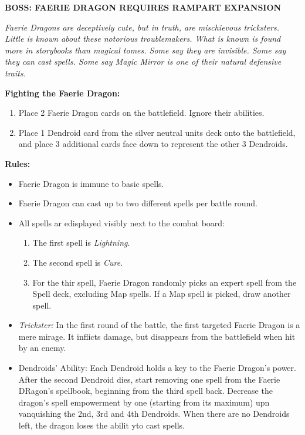 \begin{minipage}{0.32\textwidth}
\end{minipage}
\begin{minipage}{0.68\textwidth}
  \textbf{\MakeUppercase{Boss: Faerie Dragon {\scriptsize Requires Rampart Expansion}}}

  \medskip

  \textit{Faerie Dragons are deceptively cute, but in truth, are mischievous tricksters.
    Little is known about these notorious troublemakers.
    What is known is found more in storybooks than magical tomes.
    Some say they are invisible.
    Some say they can cast spells.
    Some say Magic Mirror is one of their natural defensive traits.
  }

  \medskip

  \textbf{Fighting the Faerie Dragon:}
  \begin{enumerate}
    \item Place 2 Faerie Dragon cards on the battlefield.
      Ignore their abilities.
    \item Place 1 Dendroid card from the silver neutral units deck onto the battlefield, and place 3 additional cards face down to represent the other 3 Dendroids.
  \end{enumerate}

  \medskip

  \textbf{Rules:}
  \begin{itemize}
    \item Faerie Dragon is immune to basic spells.
    \item Faerie Dragon can cast up to two different spells per battle round.
    \item All spells ar edisplayed visibly next to the combat board:
      \begin{enumerate}[leftmargin=15pt]
        \item The first spell is \textit{Lightning}.
        \item The second spell is \textit{Cure}.
        \item For the thir spell, Faerie Dragon randomly picks an expert spell from the Spell deck, excluding Map spells.
          If a Map spell is picked, draw another spell.
      \end{enumerate}
    \item \textit{Trickster:} In the first round of the battle, the first targeted Faerie Dragon is a mere mirage.
      It inflicts damage, but disappears from the battlefield when hit by an enemy.
    \item Dendroids' Ability: Each Dendroid holds a key to the Faerie Dragon's power.
      After the second Dendroid dies, start removing one spell from the Faerie DRagon's spellbook, beginning from the third spell back.
      Decrease the dragon's spell empowerment by one (starting from its maximum) upn vanquishing the 2nd, 3rd and 4th Dendroids.
      When there are no Dendroids left, the dragon loses the abilit yto cast spells.
  \end{itemize}
\end{minipage}

